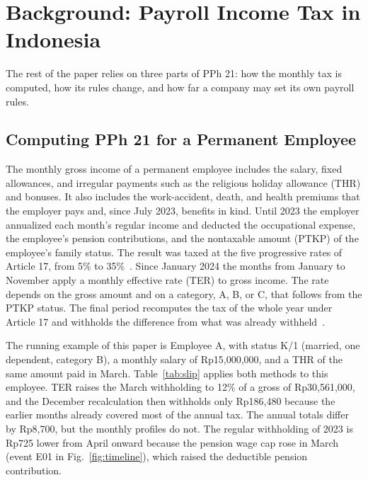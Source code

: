 \section{Background: Payroll Income Tax in Indonesia}
\label{sec:background}
The rest of the paper relies on three parts of PPh 21: how the monthly tax is computed, how its rules change, and how far a company may set its own payroll rules.

\subsection{Computing PPh 21 for a Permanent Employee}
\label{sec:pph21}
The monthly gross income of a permanent employee includes the salary, fixed allowances, and irregular payments such as the religious holiday allowance (THR) and bonuses. It also includes the work-accident, death, and health premiums that the employer pays and, since July 2023, benefits in kind. Until 2023 the employer annualized each month's regular income and deducted the occupational expense, the employee's pension contributions, and the nontaxable amount (PTKP) of the employee's family status. The result was taxed at the five progressive rates of Article 17, from 5\% to 35\%~\cite{uu7_2021,pmk101_2016,per16_2016}. Since January 2024 the months from January to November apply a monthly effective rate (TER) to gross income. The rate depends on the gross amount and on a category, A, B, or C, that follows from the PTKP status. The final period recomputes the tax of the whole year under Article 17 and withholds the difference from what was already withheld~\cite{pp58_2023,pmk168_2023}.

The running example of this paper is Employee A, with status K/1 (married, one dependent, category B), a monthly salary of Rp15,000,000, and a THR of the same amount paid in March. Table~\ref{tab:slip} applies both methods to this employee. TER raises the March withholding to 12\% of a gross of Rp30,561,000, and the December recalculation then withholds only Rp186,480 because the earlier months already covered most of the annual tax. The annual totals differ by Rp8,700, but the monthly profiles do not. The regular withholding of 2023 is Rp725 lower from April onward because the pension wage cap rose in March (event E01 in Fig.~\ref{fig:timeline}), which raised the deductible pension contribution.


